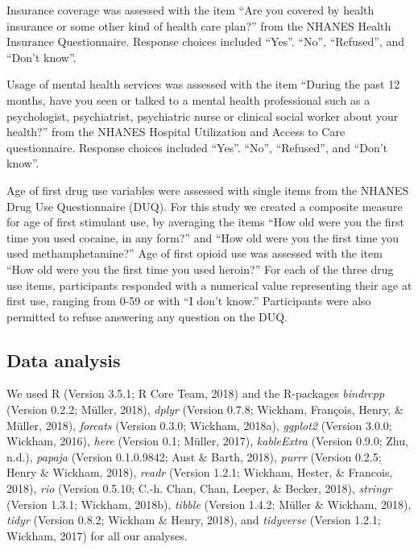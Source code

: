 \documentclass[man]{apa6}
\begin{document}
Insurance coverage was assessed with the item \enquote{Are you covered
by health insurance or some other kind of health care plan?} from the
NHANES Health Insurance Questionnaire. Response choices included
\enquote{Yes}. \enquote{No}, \enquote{Refused}, and \enquote{Don't
know}.

Usage of mental health services was assessed with the item
\enquote{During the past 12 months, have you seen or talked to a mental
health professional such as a psychologist, psychiatrist, psychiatric
nurse or clinical social worker about your health?} from the NHANES
Hospital Utilization and Access to Care questionnaire. Response choices
included \enquote{Yes}. \enquote{No}, \enquote{Refused}, and
\enquote{Don't know}.

Age of first drug use variables were assessed with single items from the
NHANES Drug Use Questionnaire (DUQ). For this study we created a
composite measure for age of first stimulant use, by averaging the items
\enquote{How old were you the first time you used cocaine, in any form?}
and \enquote{How old were you the first time you used methamphetamine?}
Age of first opioid use was assessed with the item \enquote{How old were
you the first time you used heroin?} For each of the three drug use
items, participants responded with a numerical value representing their
age at first use, ranging from 0-59 or with \enquote{I don't know.}
Participants were also permitted to refuse answering any question on the
DUQ.

\subsection{Data analysis}\label{data-analysis}

We used R (Version 3.5.1; R Core Team, 2018) and the R-packages
\emph{bindrcpp} (Version 0.2.2; Müller, 2018), \emph{dplyr} (Version
0.7.8; Wickham, François, Henry, \& Müller, 2018), \emph{forcats}
(Version 0.3.0; Wickham, 2018a), \emph{ggplot2} (Version 3.0.0; Wickham,
2016), \emph{here} (Version 0.1; Müller, 2017), \emph{kableExtra}
(Version 0.9.0; Zhu, n.d.), \emph{papaja} (Version 0.1.0.9842; Aust \&
Barth, 2018), \emph{purrr} (Version 0.2.5; Henry \& Wickham, 2018),
\emph{readr} (Version 1.2.1; Wickham, Hester, \& Francois, 2018),
\emph{rio} (Version 0.5.10; C.-h. Chan, Chan, Leeper, \& Becker, 2018),
\emph{stringr} (Version 1.3.1; Wickham, 2018b), \emph{tibble} (Version
1.4.2; Müller \& Wickham, 2018), \emph{tidyr} (Version 0.8.2; Wickham \&
Henry, 2018), and \emph{tidyverse} (Version 1.2.1; Wickham, 2017) for
all our analyses.
\end{document}
